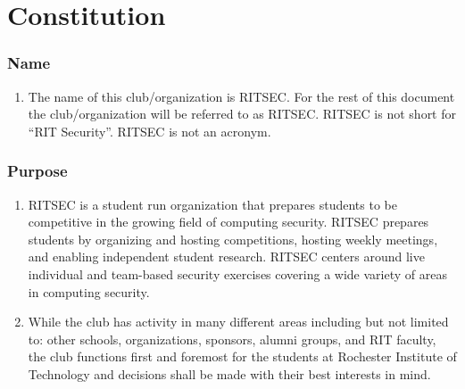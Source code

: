 \documentclass{article}
\begin{document}

\part{Constitution}


\section{Name}

\begin{enumerate}
  \item The name of this club/organization is RITSEC. For the rest of this
    document the club/organization will be referred to as RITSEC. RITSEC is not
    short for “RIT Security”. RITSEC is not an acronym.
\end{enumerate}


\section{Purpose}

\begin{enumerate}
  \item RITSEC is a student run organization that prepares students to be
    competitive in the growing field of computing security. RITSEC prepares
    students by organizing and hosting competitions, hosting weekly meetings,
    and enabling independent student research. RITSEC centers around live
    individual and team-based security exercises covering a wide variety of
    areas in computing security.
  \item While the club has activity in many different areas including but not
    limited to: other schools, organizations, sponsors, alumni groups, and RIT
    faculty, the club functions first and foremost for the students at
    Rochester Institute of Technology and decisions shall be made with their
    best interests in mind.
\end{enumerate}
\end{document}
